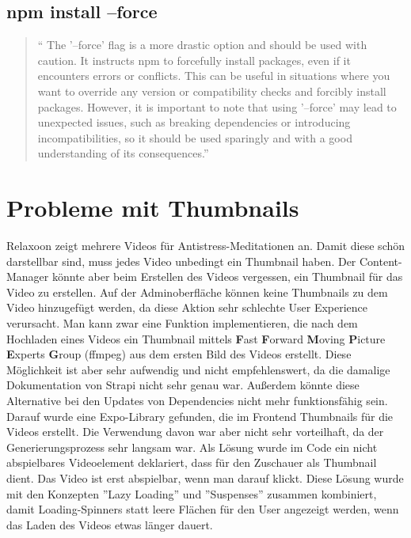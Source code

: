 \begin{spacing}{1}
    \subsection{npm install --force}\label{subsec:npm-install---force}
    \begin{quotation}
        ``
        The '--force'  flag is a more drastic option and should be used with caution.
        It instructs npm to forcefully install packages, even if it encounters errors or conflicts.
        This can be useful in situations where you want to override any version or compatibility checks
        and forcibly install packages.
        However, it is important to note that using '--force'
        may lead to unexpected issues, such as breaking dependencies or introducing incompatibilities,
        so it should be used sparingly and with a good understanding of its consequences.''
        ~\cite{installFlags}
    \end{quotation}



    \section{Probleme mit Thumbnails}\label{sec:probleme-mit-thumbnails}


    Relaxoon zeigt mehrere Videos für Antistress-Meditationen an. Damit diese schön darstellbar sind,
    muss jedes Video unbedingt ein Thumbnail haben.
    Der Content-Manager könnte aber beim Erstellen des Videos vergessen,
    ein Thumbnail für das Video zu erstellen.
    Auf der Adminoberfläche können keine Thumbnails zu dem Video hinzugefügt werden,
    da diese Aktion sehr schlechte User Experience verursacht.
    Man kann zwar eine Funktion implementieren,
    die nach dem Hochladen eines Videos ein Thumbnail mittels \textbf{F}ast \textbf{F}orward \textbf{M}oving
    \textbf{P}icture \textbf{E}xperts \textbf{G}roup (ffmpeg) aus dem ersten Bild des Videos erstellt.
    Diese Möglichkeit ist aber sehr aufwendig und nicht empfehlenswert, da die damalige Dokumentation von
    Strapi nicht sehr genau war.
    Außerdem könnte diese Alternative bei den Updates von Dependencies nicht mehr funktionsfähig sein.
    Darauf wurde eine Expo-Library gefunden, die im Frontend Thumbnails für die Videos erstellt.
    Die Verwendung davon war aber nicht sehr vorteilhaft, da der Generierungsprozess sehr langsam war.
    Als Lösung wurde im Code ein nicht abspielbares Videoelement deklariert,
    dass für den Zuschauer als Thumbnail dient.
    Das Video ist erst abspielbar, wenn man darauf klickt.
    Diese Lösung wurde mit den Konzepten ''Lazy Loading'' und ''Suspenses'' zusammen kombiniert,
    damit Loading-Spinners statt leere Flächen für den User angezeigt werden,
    wenn das Laden des Videos etwas länger dauert.




\end{spacing}
